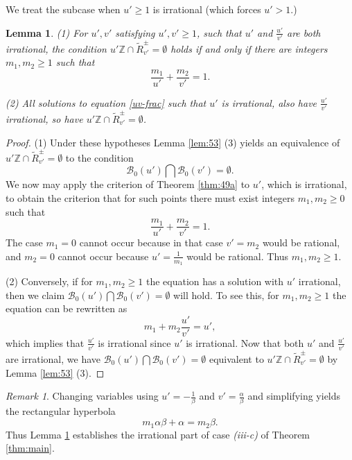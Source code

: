 \documentclass[12pt,letterpaper, reqno]{amsart}
\newtheorem{lem}[thm]{Lemma}
\theoremstyle{definition}
\theoremstyle{remark}
\newtheorem{rmk}[thm]{Remark}
\newcommand{\ZZ}{\ensuremath{\mathbb{Z}}}
\newcommand{\uu}{{u'}}
\newcommand{\vv}{{v'}}
\newcommand{\sB}{{\mathcal B}}
\begin{document}
We  treat the subcase  when $\uu \ge 1$ is irrational
(which forces $\uu >1$.) 

\begin{lem}\label{lem:54}
(1) For  $\uu, \vv$ satisfying $\uu, \vv \ge 1$,  
such that $\uu$ and $\frac{\uu}{\vv}$ are both irrational, the condition
$\uu \ZZ \cap  \widetilde{R}_{\vv}^{\pm} = \emptyset$ holds if and only if
there are integers $m_1, m_2 \ge 1$ such that
\begin{equation} \label{uv-frac}
 \frac{m_1}{\uu}+ \frac{m_2}{\vv}= 1.
\end{equation}

(2) All solutions to equation \eqref{uv-frac} such that  $\uu$ is  irrational,  also  have
$\frac{\uu}{\vv}$  irrational, so have $\uu \ZZ \cap \widetilde{R}_{\vv}^{\pm} = \emptyset$.
\end{lem}

\begin{proof} 
(1) Under these hypotheses  Lemma \ref{lem:53} (3)  yields an equivalence
of $\uu \ZZ \cap   \widetilde{R}_{  \vv}^{\pm} = \emptyset$
to the condition 
$$\sB_0(\uu) \bigcap \sB_0( {\vv}) =\emptyset.$$
We now may apply the criterion of Theorem \ref{thm:49a}
 to $\uu$, which is irrational,
to obtain the criterion that for such points there  must exist  integers $m_1, m_2 \ge 0$ such that
$$
\frac{m_1}{\uu} + \frac{m_2}{\vv} =1.
$$
The case $m_1=0$ cannot occur because in that case $\vv=  {m_2}$ would be rational, and 
$m_2=0$ cannot occur because $\uu = \frac{1}{m_1}$ would be rational. 
Thus $m_1, m_2 \ge 1$.

(2) Conversely, if for $m_1, m_2\ge 1$ 
the equation has a solution with $\uu$  irrational, then we claim $\sB_0(\uu ) \bigcap \sB_0(\vv) =\emptyset$ will hold. 
To see this, for $m_1, m_2 \ge 1$ the equation  
can be rewritten as
$$
{m_1} + m_2\frac{\uu}{\vv} = \uu,
$$
which implies that $\frac{\uu}{\vv}$ is irrational since $\uu$ is irrational. 
Now that both $\uu$ and $\frac{\uu}{\vv}$ are
irrational, we have $\sB_0(\uu ) \bigcap \sB_0( {\vv}) =\emptyset$ equivalent to 
 $\uu\ZZ \cap \widetilde{R}_{\vv}^{\pm} = \emptyset$ by Lemma \ref{lem:53} (3).
\end{proof}

\begin{rmk} 
Changing variables using $\uu= -\frac{1}{\beta}$ and $\vv= \frac{\alpha}{\beta}$
and simplifying yields the rectangular hyperbola 
$$m_1 \alpha \beta  +\alpha= m_2 \beta.$$
Thus Lemma \ref{lem:54} establishes the irrational part of
 case {\it (iii-c)} of Theorem \ref{thm:main}.
\end{rmk}
\end{document}
